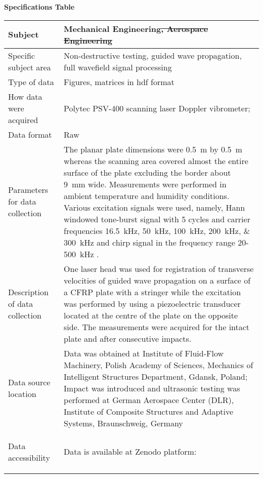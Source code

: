 \documentclass[times,final]{elsarticle}
\begin{document}
{\fontsize{7.5pt}{9pt}\selectfont
\noindent\textbf{Specifications Table} \\
 
\begin{longtable}{|p{33mm}|p{94mm}|}
\hline
\endhead
\hline
\endfoot
Subject                & Mechanical Engineering\sout{, Aerospace Engineering}\\
\hline                         
Specific subject area  & Non-destructive testing, guided wave propagation, full wavefield signal processing\\
\hline
Type of data           &  Figures, matrices in hdf format
                         \\             
How data were acquired & Polytec PSV-400 scanning laser Doppler vibrometer; \\
\hline                         
Data format            & Raw
                         \\
\hline                         
Parameters for data\newline 
collection             & The planar plate dimensions were \SI{0.5}{\meter} by \SI{0.5}{\meter} whereas the scanning area covered almost the entire surface of the plate excluding the border about \SI{9}{\milli\meter} wide. Measurements were performed in ambient temperature and humidity conditions. Various excitation signals were used, namely, Hann windowed tone-burst signal with \num{5} cycles and carrier frequencies \SIlist{16.5;50;100;200;300}{\kilo\hertz} and chirp signal in the frequency range \num{20}-\SI{500}{\kilo\hertz} .\\  

\hline
Description of          
data\newline 
collection             & One laser head was used for registration of transverse velocities of guided wave propagation on a surface of a CFRP plate with a stringer while the excitation was performed by using a piezoelectric transducer located at the centre of the plate on the opposite side. The measurements were acquired for the intact plate and after consecutive impacts. \\
\hline                         
Data source location   & Data was obtained at Institute of Fluid-Flow Machinery, Polish Academy of Sciences, Mechanics of Intelligent Structures Department, Gdansk, Poland; Impact was introduced and ultrasonic testing was performed at German Aerospace Center (DLR), Institute of Composite Structures and Adaptive Systems, Braunschweig, Germany
 \\
\hline                         
\hypertarget{target1}
{Data accessibility}   & Data is available at Zenodo platform:  
    

\end{longtable}}
\end{document}
